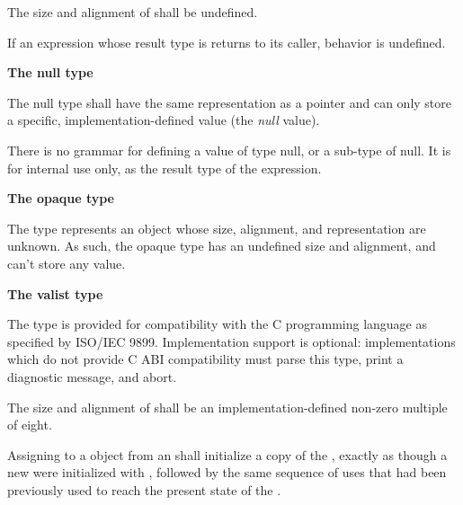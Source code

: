 \specsubsubitem
The size and alignment of  shall be undefined.

\specsubsubitem
If an expression whose result type is  returns to its caller,
behavior is undefined.


\textbf{The null type}

\specsubsubitem
The null type shall have the same representation as a pointer and can only store
a specific, implementation-defined value (the \textit{null} value).

\specsubsubitem
There is no grammar for defining a value of type null, or a sub-type of null. It
is for internal use only, as the result type of the  expression.

\textbf{The opaque type}

The  type represents an object whose size, alignment, and
representation are unknown. As such, the opaque type has an undefined size and
alignment, and can't store any value.


\textbf{The valist type}

\specsubsubitem
The  type is provided for compatibility with the C programming
language as specified by ISO/IEC 9899. Implementation support is optional:
implementations which do not provide C ABI compatibility must parse this type,
print a diagnostic message, and abort.

\specsubsubitem
The size and alignment of  shall be an implementation-defined
non-zero multiple of eight.

\specsubsubitem
Assigning to a  object from an 
shall initialize a copy of the , exactly as though
a new  were initialized with , followed by
the same sequence of  uses that had been previously used to
reach the present state of the .


